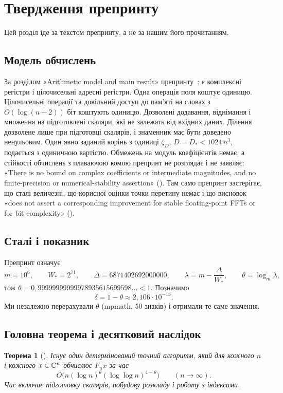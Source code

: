 \documentclass[11pt]{article}
\theoremstyle{plain}
\newtheorem{theorem}{Теорема}
\newcommand{\en}[1]{\foreignlanguage{english}{#1}}
\begin{document}
\section{Твердження препринту}\label{sec:claims}
Цей розділ іде за текстом препринту, а не за нашим його прочитанням.

\subsection{Модель обчислень}\label{sec:model}
За розділом «\en{Arithmetic model and main result}» препринту~\citep{openai2026}: є комплексні регістри і цілочисельні адресні регістри. Одна операція поля коштує одиницю. Цілочисельні операції та довільний доступ до пам'яті на словах з $O(\log(n+2))$ біт коштують одиницю. Дозволені додавання, віднімання і множення на підготовлені скаляри, які не залежать від вхідних даних. Ділення дозволене лише при підготовці скалярів, і знаменник має бути доведено ненульовим. Один явно заданий корінь з одиниці $\zeta_D$, $D=D_*<1024\,n^3$, подається з одиничною вартістю. Обмежень на модуль коефіцієнтів немає, а стійкості обчислень з плаваючою комою препринт не розглядає і не заявляє: «\en{There is no bound on complex coefficients or intermediate magnitudes, and no finite-precision or numerical-stability assertion}» (). Там само препринт застерігає, що сталі величезні, що корисної оцінки точки перетину немає і що висновок «\en{does not assert a corresponding improvement for stable floating-point FFTs or for bit complexity}» ().

\subsection{Сталі і показник}\label{sec:constants}
Препринт означує
\begin{equation}\label{eq:constants}
m=10^6,\qquad W_*=2^{71},\qquad \Delta=6871402692000000,\qquad \lambda=m-\frac{\Delta}{W_*},\qquad \theta=\log_m\lambda,
\end{equation}
тож $\theta=0{,}99999999999978935615699598\ldots<1$. Позначимо
\begin{equation}\label{eq:delta}
\delta=1-\theta\approx2{,}106\cdot10^{-13}.
\end{equation}
Ми незалежно перерахували $\theta$ (mpmath, 50 знаків) і отримали те саме значення.

\subsection{Головна теорема і десятковий наслідок}
\begin{theorem}[{\citep[Theorem~]{openai2026}}]\label{thm:main}
Існує один детермінований точний алгоритм, який для кожного $n$ і кожного $x\in\mathbb{C}^n$ обчислює $F_nx$ за час
\begin{equation}\label{eq:main-bound}
O\bigl(n(\log n)^{\theta}(\log\log n)^{4-\theta}\bigr)\qquad(n\to\infty).
\end{equation}
Час включає підготовку скалярів, побудову розкладу і роботу з індексами.
\end{theorem}
\end{document}
